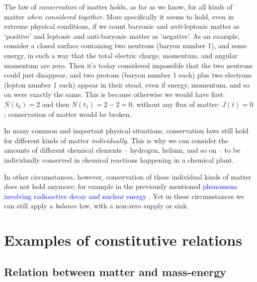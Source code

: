 \documentclass[a4paper,12pt,%
onecolumn,oneside,%
british%
]{memoir}
\renewcommand*{\|}[1][]{\nonscript\:#1\vert\nonscript\:\mathopen{}}
\newcommand*{\sect}{\S}%
\renewcommand*{\autoref}[3][\sect\,\ref]{\textcolor{blue}{#3}
\raisebox{0.6ex}{\color{blue}\miniscule%
\faIcon{angle-right}%
\;#1{#2}\;p.\,\pageref{#2}}}
\newcommand*{\masse}{mass-energy}
\newcommand*{\yti}{t_{0}}
\newcommand*{\ytf}{t_{1}}
\newcommand*{\yN}{N}
\newcommand*{\yJ}{J}
\begin{document}
The law of \emph{conservation} of matter holds, as far as we know, for all kinds of matter \emph{when considered together}.
More specifically it seems to hold, even in extreme physical conditions, if we count baryonic and \emph{anti}-leptonic matter as \enquote*{positive} and leptonic and anti-baryonic matter as \enquote*{negative}. As an example, consider a closed surface containing two neutrons (baryon number \num{+1}), and some energy, in such a way that the total electric charge, momentum, and angular momentum are zero. Then it's today considered impossible that the two neutrons could just disappear, and two protons (baryon number \num{+1} each) plus two electrons (lepton number \num{+1} each) appear in their stead, even if energy, momentum, and so on were exactly the same. This is because otherwise we would have first $\yN(\yti) = \num{+2}$ and then $\yN(\ytf) = \num{+2}-\num{2}=0$, without any flux of matter: $\yJ(t)=0$; conservation of matter would be broken.
%
%

\medskip

In many common and important physical situations, conservation laws still hold for different kinds of matter \emph{individually}. This is why we can consider the amounts of different chemical elements -- hydrogen, helium, and so on -- to be individually conserved in chemical reactions happening in a chemical plant.

In other circumstances, however, conservation of these individual kinds of matter does not hold anymore; for example in the previously mentioned \autoref{sec:intro_matter}{phenomena involving radioactive decay and nuclear energy}. Yet in these circumstances we can still apply a \emph{balance} law, with a non-zero supply or sink.

\section{Examples of constitutive relations}
\label{sec:matter_constitutive}

\subsection{Relation between matter and \masse}
\label{sec:const_matter_mass}
\end{document}
